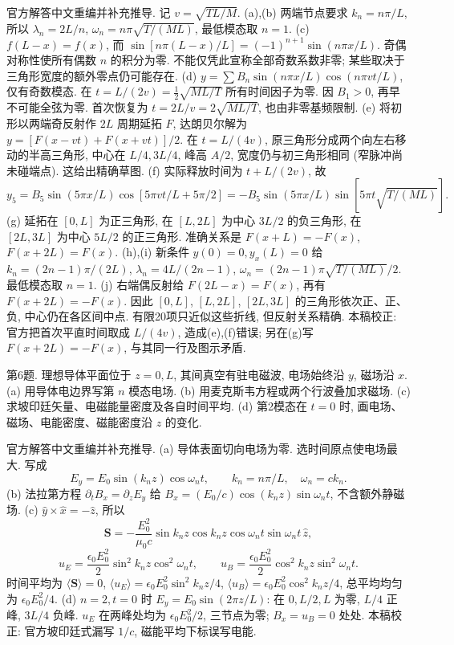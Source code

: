 \begin{solution}
官方解答中文重编并补充推导. 记 $v=\sqrt{TL/M}$. (a),(b) 两端节点要求 $k_n=n\pi/L$, 所以 $\lambda_n=2L/n$, $\omega_n=n\pi\sqrt{T/(ML)}$, 最低模态取 $n=1$.
(c) $f(L-x)=f(x)$, 而 $\sin[n\pi(L-x)/L]=(-1)^{n+1}\sin(n\pi x/L)$. 奇偶对称性使所有偶数 $n$ 的积分为零. 不能仅凭此宣称全部奇数系数非零; 某些取决于三角形宽度的额外零点仍可能存在.
(d) $y=\sum B_n\sin(n\pi x/L)\cos(n\pi vt/L)$, 仅有奇数模态. 在 $t=L/(2v)=\tfrac12\sqrt{ML/T}$ 所有时间因子为零. 因 $B_1>0$, 再早不可能全弦为零. 首次恢复为 $t=2L/v=2\sqrt{ML/T}$, 也由非零基频限制.
(e) 将初形以两端奇反射作 $2L$ 周期延拓 $F$, 达朗贝尔解为 $y=[F(x-vt)+F(x+vt)]/2$. 在 $t=L/(4v)$, 原三角形分成两个向左右移动的半高三角形, 中心在 $L/4,3L/4$, 峰高 $A/2$, 宽度仍与初三角形相同 (窄脉冲尚未碰端点). 这给出精确草图.
(f) 实际释放时间为 $t+L/(2v)$, 故
\[
y_5=B_5\sin(5\pi x/L)\cos[5\pi vt/L+5\pi/2]
=-B_5\sin(5\pi x/L)\sin[5\pi t\sqrt{T/(ML)}].
\]
(g) 延拓在 $[0,L]$ 为正三角形, 在 $[L,2L]$ 为中心 $3L/2$ 的负三角形, 在 $[2L,3L]$ 为中心 $5L/2$ 的正三角形. 准确关系是 $F(x+L)=-F(x)$, $F(x+2L)=F(x)$.
(h),(i) 新条件 $y(0)=0,y_x(L)=0$ 给 $k_n=(2n-1)\pi/(2L)$, $\lambda_n=4L/(2n-1)$, $\omega_n=(2n-1)\pi\sqrt{T/(ML)}/2$. 最低模态取 $n=1$.
(j) 右端偶反射给 $F(2L-x)=F(x)$, 再有 $F(x+2L)=-F(x)$. 因此 $[0,L]$, $[L,2L]$, $[2L,3L]$ 的三角形依次正、正、负, 中心仍在各区间中点. 有限20项只近似这些折线, 但反射关系精确.
本稿校正: 官方把首次平直时间取成 $L/(4v)$, 造成(e),(f)错误; 另在(g)写 $F(x+2L)=-F(x)$, 与其同一行及图示矛盾.
\end{solution}
\begin{exercise}\label{exam:e2.6}
第6题. 理想导体平面位于 $z=0,L$, 其间真空有驻电磁波, 电场始终沿 $y$, 磁场沿 $x$. (a) 用导体电边界写第 $n$ 模态电场. (b) 用麦克斯韦方程或两个行波叠加求磁场. (c) 求坡印廷矢量、电磁能量密度及各自时间平均. (d) 第2模态在 $t=0$ 时, 画电场、磁场、电能密度、磁能密度沿 $z$ 的变化.
\end{exercise}
\begin{solution}
官方解答中文重编并补充推导. (a) 导体表面切向电场为零. 选时间原点使电场最大. 写成
\[E_y=E_0\sin(k_nz)\cos\omega_nt,\qquad k_n=n\pi/L,\quad\omega_n=ck_n.\]
(b) 法拉第方程 $\partial_tB_x=\partial_zE_y$ 给 $B_x=(E_0/c)\cos(k_nz)\sin\omega_nt$, 不含额外静磁场.
(c) $\hat y\times\hat x=-\hat z$, 所以
\[
\boldsymbol S=-\frac{E_0^2}{\mu_0c}\sin k_nz\cos k_nz\cos\omega_nt\sin\omega_nt\,\hat z,
\]
\[
u_E=\frac{\epsilon_0E_0^2}{2}\sin^2k_nz\cos^2\omega_nt,\qquad
u_B=\frac{\epsilon_0E_0^2}{2}\cos^2k_nz\sin^2\omega_nt.
\]
时间平均为 $\langle\boldsymbol S\rangle=0$, $\langle u_E\rangle=\epsilon_0E_0^2\sin^2k_nz/4$, $\langle u_B\rangle=\epsilon_0E_0^2\cos^2k_nz/4$, 总平均均匀为 $\epsilon_0E_0^2/4$.
(d) $n=2,t=0$ 时 $E_y=E_0\sin(2\pi z/L)$: 在 $0,L/2,L$ 为零, $L/4$ 正峰, $3L/4$ 负峰. $u_E$ 在两峰处均为 $\epsilon_0E_0^2/2$, 三节点为零; $B_x=u_B=0$ 处处. 本稿校正: 官方坡印廷式漏写 $1/c$, 磁能平均下标误写电能.
\end{solution}
